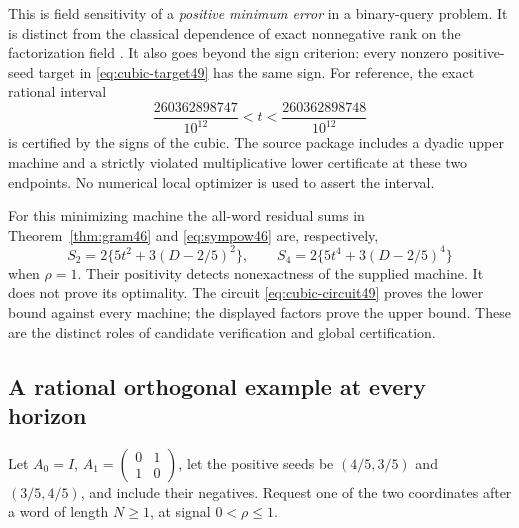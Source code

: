 This is field sensitivity of a \emph{positive minimum error} in a
binary-query problem. It is distinct from the classical dependence
of exact nonnegative rank on the factorization field
\cite{Shitov18}. It also goes beyond the sign criterion: every nonzero
positive-seed target in \eqref{eq:cubic-target49} has the same sign.
For reference, the exact rational interval
\[
 \frac{260362898747}{10^{12}}<t<
 \frac{260362898748}{10^{12}}
\]
is certified by the signs of the cubic. The source package includes
a dyadic upper machine and a strictly violated multiplicative lower
certificate at these two endpoints. No numerical local optimizer is
used to assert the interval.

For this minimizing machine the all-word residual sums in
Theorem~\ref{thm:gram46} and \eqref{eq:sympow46} are, respectively,
\[
 S_2=2\{5t^2+3(D-2/5)^2\},\qquad
 S_4=2\{5t^4+3(D-2/5)^4\}
\]
when $\rho=1$. Their positivity detects nonexactness of the supplied
machine. It does not prove its optimality. The circuit
\eqref{eq:cubic-circuit49} proves the lower bound against every
machine; the displayed factors prove the upper bound. These are the
distinct roles of candidate verification and global certification.

\subsection{A rational orthogonal example at every horizon}
Let $A_0=I$, $A_1=\left(\begin{smallmatrix}0&1\\1&0\end{smallmatrix}\right)$,
let the positive seeds be $(4/5,3/5)$ and $(3/5,4/5)$, and include
their negatives. Request one of the two coordinates after a word of
length $N\ge1$, at signal $0<\rho\le1$.

